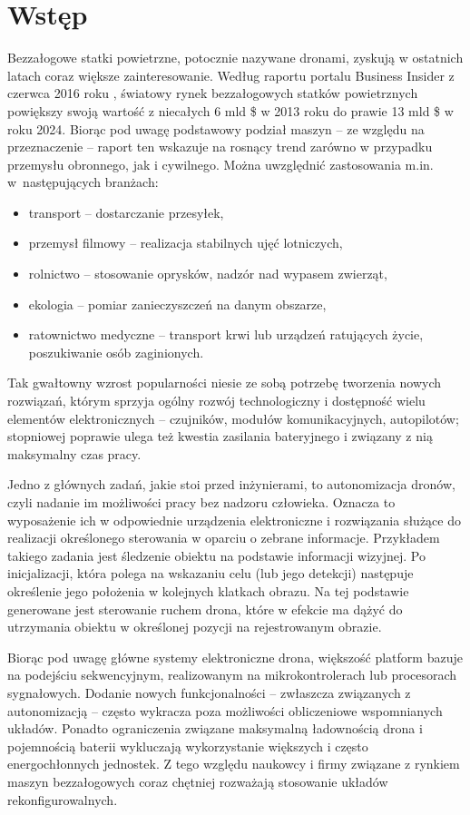 \chapter{Wstęp}
\label{cha:wstep}

Bezzałogowe statki powietrzne, potocznie nazywane dronami, zyskują w ostatnich latach coraz większe zainteresowanie. 
Według raportu portalu Business Insider z czerwca 2016 roku \cite{BInsider}, światowy rynek bezzałogowych statków powietrznych powiększy swoją wartość z niecałych 6 mld \$ w 2013 roku do prawie 13 mld \$ w roku 2024. 
Biorąc pod uwagę podstawowy podział maszyn -- ze względu na przeznaczenie -- raport ten wskazuje na rosnący trend zarówno w przypadku przemysłu obronnego, jak i cywilnego. Można uwzględnić zastosowania m.in. w~następujących branżach:
\begin{itemize}
	\item transport -- dostarczanie przesyłek,
	\item przemysł filmowy -- realizacja stabilnych ujęć lotniczych,
	\item rolnictwo -- stosowanie oprysków, nadzór nad wypasem zwierząt,
	\item ekologia -- pomiar zanieczyszczeń na danym obszarze,
	\item ratownictwo medyczne -- transport krwi lub urządzeń ratujących życie, poszukiwanie osób zaginionych.
\end{itemize}
Tak gwałtowny wzrost popularności niesie ze sobą potrzebę tworzenia nowych rozwiązań, którym sprzyja ogólny rozwój technologiczny i dostępność wielu elementów elektronicznych -- czujników, modułów komunikacyjnych, autopilotów; stopniowej poprawie ulega też kwestia zasilania bateryjnego i związany z nią maksymalny czas pracy. 

Jedno z głównych zadań, jakie stoi przed inżynierami, to autonomizacja dronów, czyli nadanie im możliwości pracy bez nadzoru człowieka.
Oznacza to wyposażenie ich w odpowiednie urządzenia elektroniczne i rozwiązania służące do realizacji określonego sterowania w oparciu o zebrane informacje. 
Przykładem takiego zadania jest śledzenie obiektu na podstawie informacji wizyjnej. 
Po inicjalizacji, która polega na wskazaniu celu (lub jego detekcji) następuje określenie jego położenia w kolejnych klatkach obrazu. 
Na tej podstawie generowane jest sterowanie ruchem drona, które w efekcie ma dążyć do utrzymania obiektu w określonej pozycji na rejestrowanym obrazie.

Biorąc pod uwagę główne systemy elektroniczne drona, większość platform bazuje na podejściu sekwencyjnym, realizowanym na mikrokontrolerach lub procesorach sygnałowych. Dodanie nowych funkcjonalności -- zwłaszcza związanych z autonomizacją -- często wykracza poza możliwości obliczeniowe wspomnianych układów. 
Ponadto ograniczenia związane maksymalną ładownością drona i pojemnością baterii wykluczają wykorzystanie większych i często energochłonnych jednostek.  
Z tego względu naukowcy i firmy związane z rynkiem maszyn bezzałogowych coraz chętniej rozważają stosowanie układów rekonfigurowalnych.



